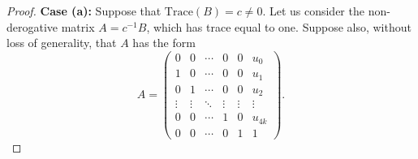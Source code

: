 \documentclass{amsart}
\theoremstyle{definition}
\theoremstyle{remark}
\numberwithin{equation}{section}
\begin{document}
\begin{proof}
{\bf Case (a):} Suppose that $\text{Trace}(B)=c\ne 0$. Let us consider the non-derogative matrix $A=c^{-1} B$, which has trace equal to one. Suppose also, without loss of generality, that $A$ has the form
$$A=\left(\begin{array}{cccccc}
                                                                          0 & 0 & \cdots & 0 & 0 &u_0\\
                                                                          1 & 0 & \cdots & 0 & 0 &u_1\\
                                                                          0 & 1 & \cdots & 0 & 0 &u_2\\
                                                                          \vdots & \vdots & \ddots & \vdots & \vdots &\vdots\\
                                                                          0 & 0 & \cdots & 1 & 0 &u_{4k}\\
                                                                          0 & 0 & \cdots & 0 & 1 &1
                                                                        \end{array}\right).$$


\end{proof}
\end{document}
